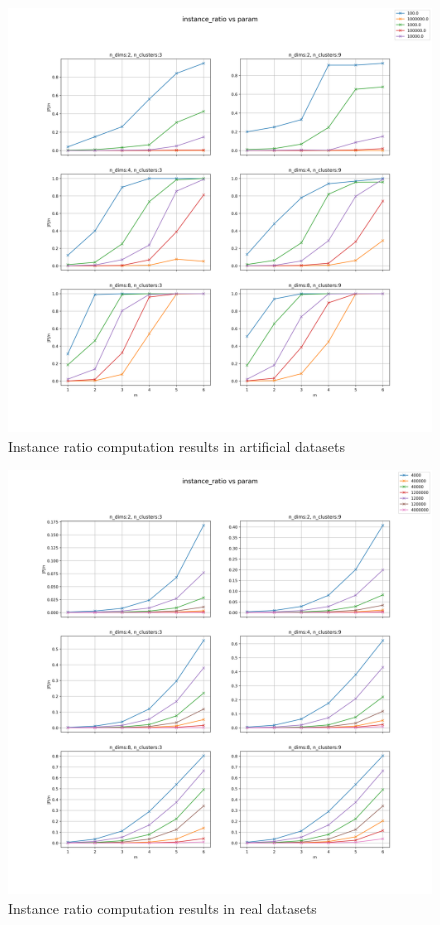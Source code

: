 \begin{figure}[!ht]
    \includegraphics[width=\linewidth]{images/experiments/instance_ratio_artificial.png}
    \caption{Instance ratio computation results in artificial datasets}
    \label{fig:instance_art}
\end{figure}

\begin{figure}[!ht]
    \includegraphics[width=\linewidth]{images/experiments/instance_ratio_real.png}
    \caption{Instance ratio computation results in real datasets}
    \label{fig:instance_real}
\end{figure}

